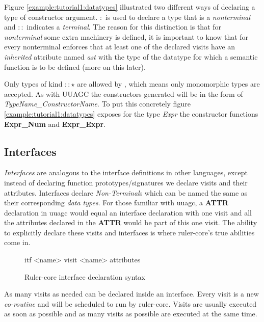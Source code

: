 Figure \ref{example:tutorial1:datatypes} illustrated two different ways of declaring a type of constructor argument. $:$ is used to declare a type that is a \emph{nonterminal} and $::$ indicates a \emph{terminal}. The reason for this distinction is that for \emph{nonterminal} some extra machinery is defined, it is important to know that for every nonterminal \rcore enforces that at least one of the declared visits have an \emph{inherited} attribute named \emph{ast} with the type of the datatype for which a semantic function is to be defined (more on this later).

Only types of kind $:: \star$ are allowed by \rcore, which means only monomorphic types are accepted. As with UUAGC the constructors generated will be in the form of \emph{TypeName\_ConstructorName}. To put this concretely figure \ref{example:tutorial1:datatypes} exposes for the type \emph{Expr} the constructor functions \textbf{Expr\_Num} and \textbf{Expr\_Expr}.

\subsection{Interfaces}
\emph{Interfaces} are analogous to the interface definitions in other languages, except instead of declaring function prototypes/signatures we declare visits and their attributes. Interfaces declare \emph{Non-Terminal}s which can be named the same as their corresponding \emph{data types}. For those familiar with uuagc, a \textbf{ATTR} declaration in uuagc would equal an interface declaration with one visit and all the attributes declared in the \textbf{ATTR} would be part of this one visit. The ability to explicitly declare these visits and interfaces is where ruler-core's true abilities come in.

\begin{figure}[h!]
\begin{code}
itf <name>
  {visit <name>
    {attributes}
  }
\end{code}
\caption{Ruler-core interface declaration syntax}
\label{itf:syntax}
\end{figure}

As many visits as needed can be declared inside an interface. Every visit is a new \emph{co-routine} and will be scheduled to run by ruler-core. Visits are usually executed as soon as possible and as many visits as possible are executed at the same time. %

